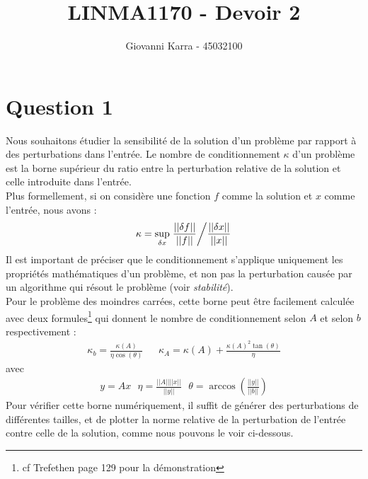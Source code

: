 \documentclass[11pt]{article}
\title{LINMA1170 - Devoir 2}
\author{Giovanni Karra - 45032100}
\begin{document}
\maketitle

\section*{Question 1}
Nous souhaitons étudier la sensibilité de la solution d'un problème par rapport à des perturbations dans l'entrée. Le nombre de conditionnement $\kappa$ d'un problème est la borne supérieur du ratio entre la perturbation relative de la solution et celle introduite dans l'entrée. \\
Plus formellement, si on considère une fonction $f$ comme la solution et $x$ comme l'entrée, nous avons :
\begin{align}
    \kappa = \sup_{\delta x}\left. \frac{||\delta f||}{||f||} \middle/ \frac{||\delta x||}{||x||} \right.
\end{align}
Il est important de préciser que le conditionnement s'applique uniquement les propriétés mathématiques d'un problème, et non pas la perturbation causée par un algorithme qui résout le problème (voir \textit{stabilité}).\\
Pour le problème des moindres carrées, cette borne peut être facilement calculée avec deux formules\footnote{cf Trefethen page 129 pour la démonstration} qui donnent le nombre de conditionnement selon $A$ et selon $b$ respectivement :
\begin{align}
    \kappa_b = \frac{\kappa(A)}{\eta \cos(\theta)}~~~~~~~\kappa_A = \kappa(A) + \frac{\kappa(A)^2\tan(\theta)}{\eta}
\end{align}
avec
\begin{align}
    y = Ax ~~~ \eta = \frac{||A||||x||}{||y||} ~~~
    \theta = \arccos\left(\frac{||y||}{||b||}\right)
\end{align}
Pour vérifier cette borne numériquement, il suffit de générer des perturbations de différentes tailles, et de plotter la norme relative de la perturbation de l'entrée contre celle de la solution, comme nous pouvons le voir ci-dessous.
\end{document}

